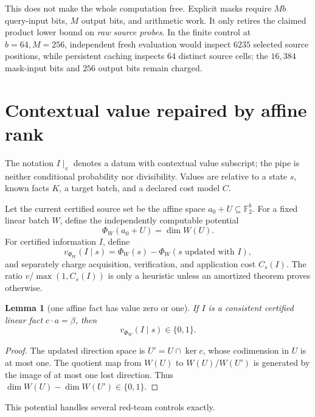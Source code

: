 \documentclass[11pt]{article}
\newtheorem{lemma}[theorem]{Lemma}
\newcommand{\F}{\mathbb F}
\begin{document}
This does not make the whole computation free.  Explicit masks require $Mb$ query-input bits, $M$ output bits, and arithmetic work.  It only retires the claimed product lower bound on \emph{raw source probes}.  In the finite control at $b=64,M=256$, independent fresh evaluation would inspect $6235$ selected source positions, while persistent caching inspects $64$ distinct source cells; the $16{,}384$ mask-input bits and $256$ output bits remain charged.

\section{Contextual value repaired by affine rank}

The notation $I\mid_{v}$ denotes a datum with contextual value subscript; the pipe is neither conditional probability nor divisibility.  Values are relative to a state $s$, known facts $K$, a target batch, and a declared cost model $C$.

Let the current certified source set be the affine space $a_0+U\subseteq\F_2^b$.  For a fixed linear batch $W$, define the independently computable potential
\[
\Phi_W(a_0+U)=\dim W(U).
\]
For certified information $I$, define
\[
v_{\Phi_W}(I\mid s)=\Phi_W(s)-\Phi_W(s\text{ updated with }I),
\]
and separately charge acquisition, verification, and application cost $C_s(I)$.  The ratio $v/\max(1,C_s(I))$ is only a heuristic unless an amortized theorem proves otherwise.

\begin{lemma}[one affine fact has value zero or one]\label{lem:value}
If $I$ is a consistent certified linear fact $c\cdot a=\beta$, then
\[
v_{\Phi_W}(I\mid s)\in\{0,1\}.
\]
\end{lemma}

\begin{proof}
The updated direction space is $U'=U\cap\ker c$, whose codimension in $U$ is at most one.  The quotient map from $W(U)$ to $W(U)/W(U')$ is generated by the image of at most one lost direction.  Thus $\dim W(U)-\dim W(U')\in\{0,1\}$.
\end{proof}

This potential handles several red-team controls exactly.
\end{document}
